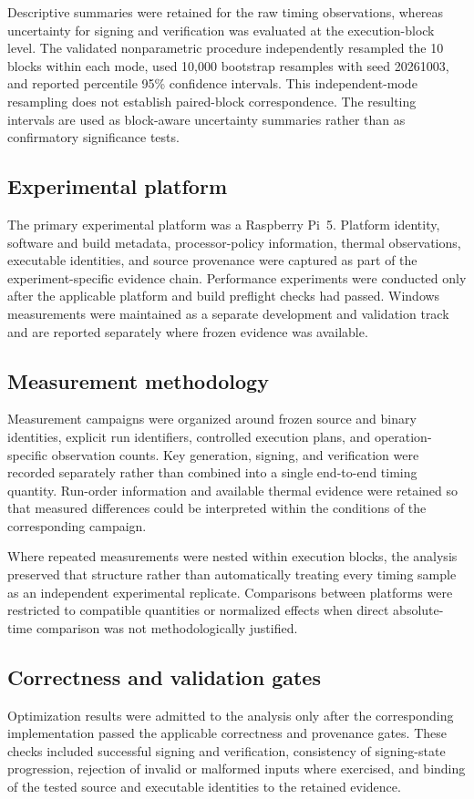 \documentclass[pdflatex,sn-mathphys-num]{sn-jnl}
\begin{document}
Descriptive summaries were retained for the raw timing observations, whereas
uncertainty for signing and verification was evaluated at the execution-block
level. The validated nonparametric procedure independently resampled the 10
blocks within each mode, used 10,000 bootstrap resamples with seed 20261003,
and reported percentile 95\% confidence intervals. This independent-mode
resampling does not establish paired-block correspondence. The resulting
intervals are used as block-aware uncertainty summaries rather than as
confirmatory significance tests.

\label{sec:methodology}

\subsection{Experimental platform}
The primary experimental platform was a Raspberry Pi~5. Platform
identity, software and build metadata, processor-policy information,
thermal observations, executable identities, and source provenance
were captured as part of the experiment-specific evidence chain.
Performance experiments were conducted only after the applicable
platform and build preflight checks had passed. Windows measurements
were maintained as a separate development and validation track and are
reported separately where frozen evidence was available.

\subsection{Measurement methodology}
Measurement campaigns were organized around frozen source and binary
identities, explicit run identifiers, controlled execution plans, and
operation-specific observation counts. Key generation, signing, and
verification were recorded separately rather than combined into a
single end-to-end timing quantity. Run-order information and available
thermal evidence were retained so that measured differences could be
interpreted within the conditions of the corresponding campaign.

Where repeated measurements were nested within execution blocks, the
analysis preserved that structure rather than automatically treating
every timing sample as an independent experimental replicate.
Comparisons between platforms were restricted to compatible quantities
or normalized effects when direct absolute-time comparison was not
methodologically justified.

\subsection{Correctness and validation gates}
Optimization results were admitted to the analysis only after the
corresponding implementation passed the applicable correctness and
provenance gates. These checks included successful signing and
verification, consistency of signing-state progression, rejection of
invalid or malformed inputs where exercised, and binding of the tested
source and executable identities to the retained evidence.
\end{document}

